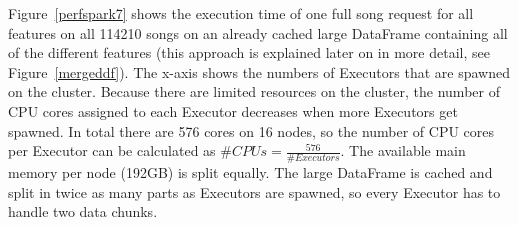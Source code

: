 \noindent Figure~\ref{perfspark7} shows the execution time of one full song request for all features on all 114210 songs on an already cached large DataFrame containing all of the different features (this approach is explained later on in more detail, see Figure~\ref{mergeddf}).
The x-axis shows the numbers of Executors that are spawned on the cluster. Because there are limited resources on the cluster, the number of CPU cores assigned to each Executor decreases when more Executors get spawned. In total there are 576 cores on 16 nodes, so the number of CPU cores per Executor can be calculated as $\#CPUs = \frac{576}{\#Executors}$. The available main memory per node (192GB) is split equally. The large DataFrame is cached and split in twice as many parts as Executors are spawned, so every Executor has to handle two data chunks.


